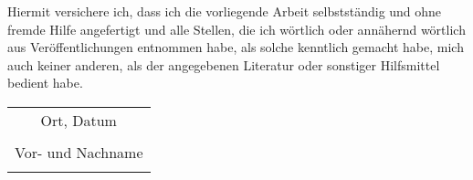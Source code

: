 


Hiermit versichere ich, dass ich die vorliegende Arbeit selbstständig und ohne fremde Hilfe angefertigt und alle Stellen, die ich wörtlich oder annähernd wörtlich aus Veröffentlichungen entnommen habe, als solche kenntlich gemacht habe, mich auch keiner anderen, als der angegebenen Literatur oder sonstiger Hilfsmittel bedient habe.

\bigskip
\bigskip
\bigskip
\bigskip
\bigskip

\begin{flushright}
\begin{tabular}{c}
Ort, Datum
\vspace*{1.5cm} \\

\dotfill \\
Vor- und Nachname \\
\hspace{5cm} \\
\end{tabular}
\end{flushright}

